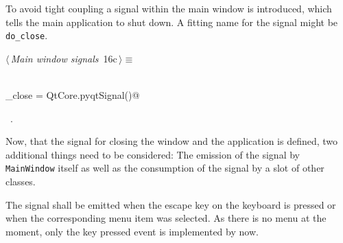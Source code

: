 \documentclass[
    a4paper,      %
    10pt,         %
    openright,    %
    notitlepage,  %
    parskip=half, %
]{scrreprt}       %
\theoremstyle{definition}                    %
\begin{document}
To avoid tight coupling a signal within the main window is introduced, which
tells the main application to shut down. A fitting name for the signal might be
\verb=do_close=.

\begin{flushleft} \small
\begin{minipage}{\linewidth}\label{scrap7}\raggedright\small
{} $\langle\,${\itshape Main window signals}\nobreak\ {\footnotesize {16c}}$\,\rangle\equiv$
\vspace{-1ex}
\begin{list}{}{} \item
\mbox{}\lstinline@@\\
\mbox{}\lstinline@do_close = QtCore.pyqtSignal()@\\
\mbox{}\lstinline@@{\NWsep}
\end{list}
\vspace{-1.5ex}
\footnotesize
\begin{list}{}{\setlength{\itemsep}{-\parsep}\setlength{\itemindent}{-\leftmargin}}
\item \NWtxtMacroRefIn\ .

\item{}
\end{list}
\end{minipage}\vspace{4ex}
\end{flushleft}
Now, that the signal for closing the window and the application is defined, two
additional things need to be considered: The emission of the signal by
\verb=MainWindow= itself as well as the consumption of the signal by a slot of
other classes.

The signal shall be emitted when the escape key on the keyboard is pressed or
when the corresponding menu item was selected. As there is no menu at the
moment, only the key pressed event is implemented by now.
\end{document}
